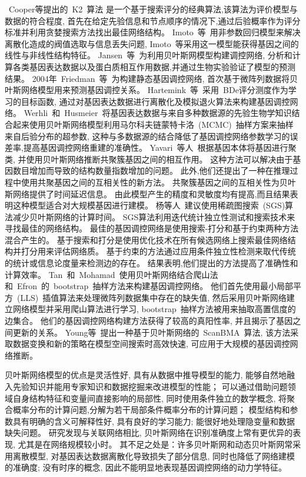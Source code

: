 ~Cooper等提出的~K2~算法\cite{cooper1992bayesian}
是一个基于搜索评分的经典算法,该算法为评价模型与数据的符合程度,
首先在给定先验信息和节点顺序的情况下,通过后验概率作为评分标准并利用贪婪搜索方法找出最佳网络结构。
Imoto~等~\cite{kim2003inferring}用非参数回归模型来解决离散化造成的阀值选取与信息丢失问题,
Imoto~等采用这一模型能获得基因之间的线性与非线性结构特征。
Jansen~等~\cite{jansen2003bayesian}为利用贝叶斯网模型构建调控网络,
分析和计算各类基因表达数据以及蛋白质相互作用数据,并通过生物实验验证了模型的预测结果。
2004年~Friedman~等~\cite{friedman2004inferring}为构建静态基因调控网络,
首次基于微阵列数据将贝叶斯网络模型用来预测基因调控关系。
Hartemink~等~\cite{hartemink2005reverse}采用~BDe评分测度作为学习的目标函数,
通过对基因表达数据进行离散化及模拟退火算法来构建基因调控网络。
Werhli~和~Husmeier~\cite{werhli2007reconstructing}将基因表达数据与来自多种数据源的先验生物学知识结合起来使用贝叶斯网络模型利用马尔科夫链蒙特卡洛~(MCMC)~抽样方案来抽样来自后验分布的超参数,
这种与多数据源的结合降低了基因调控网络参数学习的误差率,提高基因调控网络重建的准确性。
Yavari~等人~\cite{yavari2008gene}根据基因本体将基因进行聚类,
并使用贝叶斯网络推断共聚簇基因之间的相互作用。
这种方法可以解决由于基因数目增加而导致的结构数量指数增加的问题。 
此外,他们还提出了一种在推理过程中使用共聚基因之间的互相关性的新方法。
共聚簇基因之间的互相关性为贝叶斯网络提供了时间延迟信息。 
由此模型产生的精度和灵敏度均有提高,而且结果表明这种模型适合对大规模基因进行建模。
杨等人~\cite{yang2011bayesian}建议使用稀疏图搜索~(SGS)算法减少贝叶斯网络的计算时间。
SGS算法利用迭代统计独立性测试和搜索技术来寻找最佳的网络结构。
最佳的基因调控网络是使用搜索-打分和基于约束两种方法混合产生的。
基于搜索和打分是使用优化技术在所有候选网络上搜索最佳网络结构并打分用来评估网络质。
基于约束的方法通过应用条件独立性检测来取代传统的统计或信息论度量来检测边的存在。
结果表明,他们提出的方法提高了准确性和计算效率。
Tan~和~Mohamad~\cite{kunga2012using}使用贝叶斯网络结合爬山法和~Efron~的~bootstrap~抽样方法来构建基因调控网络。
他们首先使用最小局部平方~(LLS)~插值算法来处理微阵列数据集中存在的缺失值, 
然后采用贝叶斯网络建立网络模型并采用爬山算法进行学习, 
bootstrap~抽样方法被用来抽取高置信度的边集合。
他们的基因调控网络构建方法获得了较高的真阳性率, 并且揭示了基因之间更新的关系。 
Young等~\cite{young2014fast}提出一种基于贝叶斯网络的~ScanBMA~算法,
该方法采取数据变换和新的策略在模型空间搜索时高效快速,
可应用于大规模的基因调控网络推断。

贝叶斯网络模型的优点是灵活性好, 具有从数据中推导模型的能力, 能够自然地融入先验知识并能用专家知识和数据挖掘来改进模型的性能；
可以通过借助问题领域自身结构特征和变量间直接影响的局部性, 同时使用条件独立的数学概念, 将聚合概率分布的计算问题,分解为若干局部条件概率分布的计算问题；
模型结构和参数具有明确的含义可解释性好, 具有良好的学习能力; 能很好地处理隐变量和数据缺失问题。
研究发现与关联网络相比, 贝叶斯网络在识别准确度上常有更优异的表现, 尤其是在网络规模较小时。
其不足之处是：许多贝叶斯网和动态贝叶斯网常采用离散模型, 对基因表达数据离散化导致损失了部分信息,
同时也降低了网络建模的准确度;
没有时序的概念, 因此不能明显地表现基因调控网络的动力学特征。

